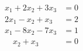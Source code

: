 \begin{align*}
x_1 + 2x_2 + 3x_3 &= 0\\
2x_1 - x_2 + x_3 &= 2\\
x_1 - 8x_2 - 7x_3 &= 1\\
\quad x_2 + x_3 &= 0
\end{align*}
